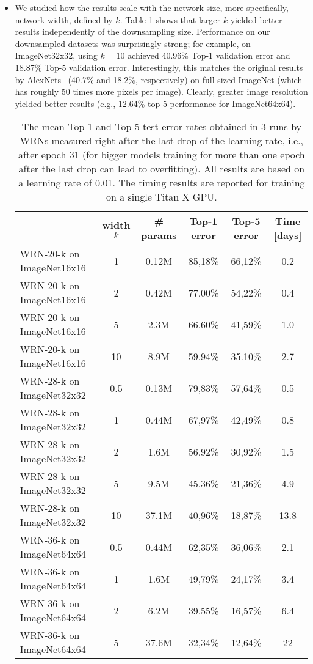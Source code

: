 \documentclass{article} \usepackage{iclr2017_conference,times}
\begin{document}
\begin{itemize}
	\item We studied how the results scale with the network size, more specifically, network width, defined by $k$. Table \ref{Table1} shows that larger $k$ yielded better results independently of the downsampling size.
Performance on our downsampled datasets was surprisingly strong; for example, on ImageNet32x32, using $k=10$ achieved 40.96\% Top-1 validation error and 18.87\% Top-5 validation error. Interestingly, this matches the original results by AlexNets~\citep{krizhevsky2012imagenet} (40.7\% and 18.2\%, respectively) on full-sized ImageNet (which has roughly 50 times more pixels per image). Clearly, greater image resolution yielded better results (e.g., 12.64\% top-5 performance for ImageNet64x64).
    

\begin{table}[tbp]
\renewcommand{\arraystretch}{1.2}
\begin{center}
  \begin{tabular}{| l | c | c | c | c | c |}
    \hline
		& width $k$ & \# params & Top-1 error & Top-5 error & Time [days] \\ \hline
		WRN-20-k on ImageNet16x16	& 1 &  0.12M &  85,18\% &  66,12\% & 0.2\\
		WRN-20-k on ImageNet16x16	& 2 &  0.42M &  77,00\% &  54,22\% & 0.4\\
		WRN-20-k on ImageNet16x16	& 5 &  2.3M &  66,60\% &  41,59\% & 1.0\\
		WRN-20-k on ImageNet16x16	& 10 &  8.9M &  59.94\% &  35.10\% & 2.7\\ \hline
		WRN-28-k on ImageNet32x32	& 0.5 &  0.13M &  79,83\% &  57,64\%  & 0.5\\
		WRN-28-k on ImageNet32x32	& 1 &  0.44M &  67,97\% &  42,49\%  & 0.8\\
        WRN-28-k on ImageNet32x32	& 2 &  1.6M &  56,92\% &  30,92\%  & 1.5\\
        WRN-28-k on ImageNet32x32	& 5 &  9.5M &  45,36\% &  21,36\%  & 4.9\\
        WRN-28-k on ImageNet32x32	& 10 &  37.1M &  40,96\% &  18,87\% & 13.8\\ \hline
        WRN-36-k on ImageNet64x64	& 0.5 &  0.44M &  62,35\%  &  36,06\% & 2.1\\
        WRN-36-k on ImageNet64x64	& 1 &  1.6M &  49,79\%  &  24,17\% &  3.4\\
        WRN-36-k on ImageNet64x64	& 2 &  6.2M &  39,55\% &  16,57\%  & 6.4\\
        WRN-36-k on ImageNet64x64	& 5 &  37.6M &  32,34\% &  12,64\%  & 22\\
    \hline
  \end{tabular}
\end{center}
\caption{The mean Top-1 and Top-5 test error rates obtained in 3 runs by WRNs measured right after the last drop of the learning rate, i.e., after epoch 31 (for bigger models training for more than one epoch after the last drop can lead to overfitting). All results are based on a learning rate of 0.01. The timing results are reported for training on a single Titan X GPU.}
\label{Table1}
\end{table}


\end{itemize}
\end{document}
